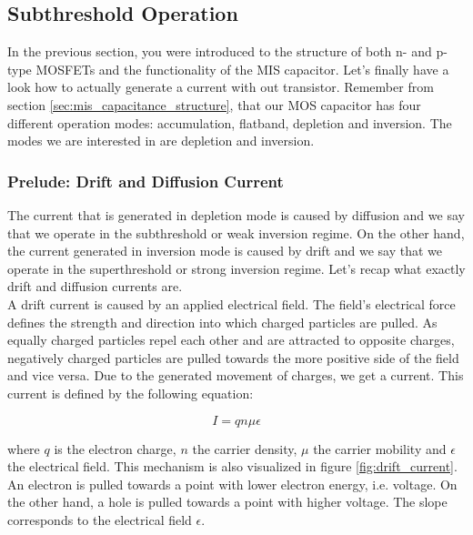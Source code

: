 \subsection{Subthreshold Operation}

In the previous section, you were introduced to the structure of both n- and p-type MOSFETs and the functionality of the MIS capacitor. Let's finally have a look how to actually generate a current with out transistor. Remember from section \ref{sec:mis_capacitance_structure}, that our MOS capacitor has four different operation modes: accumulation, flatband, depletion and inversion. The modes we are interested in are depletion and inversion. 

\subsubsection{Prelude: Drift and Diffusion Current}

The current that is generated in depletion mode is caused by diffusion and we say that we operate in the subthreshold or weak inversion regime. On the other hand, the current generated in inversion mode is caused by drift and we say that we operate in the superthreshold or strong inversion regime. Let's recap what exactly drift and diffusion currents are.\\

A drift current is caused by an applied electrical field. The field's electrical force defines the strength and direction into which charged particles are pulled. As equally charged particles repel each other and are attracted to opposite charges, negatively charged particles are pulled towards the more positive side of the field and vice versa. Due to the generated movement of charges, we get a current. This current is defined by the following equation:

\begin{equation}
    I = q n \mu \epsilon
\end{equation}

where $q$ is the electron charge, $n$ the carrier density, $\mu$ the carrier mobility and $\epsilon$ the electrical field. This mechanism is also visualized in figure \ref{fig:drift_current}. An electron is pulled towards a point with lower electron energy, i.e. voltage. On the other hand, a hole is pulled towards a point with higher voltage. The slope corresponds to the electrical field $\epsilon$.\\

